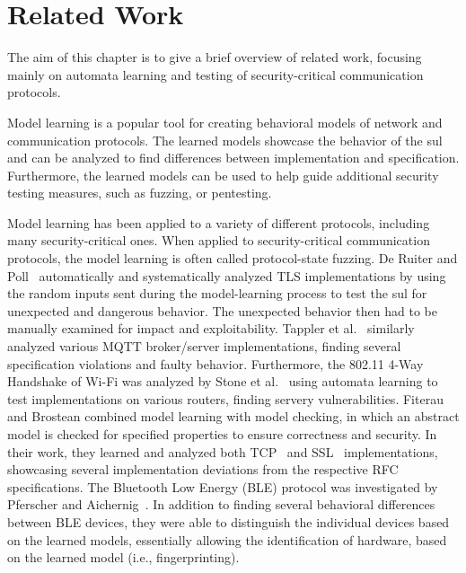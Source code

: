 %
%
% 

\chapter{Related Work}

\label{chap:Related}
The aim of this chapter is to give a brief overview of related work, focusing mainly on automata learning and testing of security-critical communication protocols.

Model learning is a popular tool for creating behavioral models of network and communication protocols. The learned models showcase the behavior of the \ac{sul} and can be analyzed to find differences between implementation and specification. Furthermore, the learned models can be used to help guide additional security testing measures, such as fuzzing, or pentesting. 

Model learning has been applied to a variety of different protocols, including many security-critical ones. When applied to security-critical communication protocols, the model learning is often called protocol-state fuzzing. De Ruiter and Poll~\cite{DBLP:conf/uss/RuiterP15} automatically and systematically analyzed TLS implementations by using the random inputs sent during the model-learning process to test the \ac{sul} for unexpected and dangerous behavior. The unexpected behavior then had to be manually examined for impact and exploitability. Tappler et al.~\cite{DBLP:conf/icst/TapplerAB17} similarly analyzed various MQTT broker/server implementations, finding several specification violations and faulty behavior. Furthermore, the 802.11 4-Way Handshake of Wi-Fi was analyzed by Stone et al.~\cite{DBLP:conf/esorics/StoneCR18} using automata learning to test implementations on various routers, finding servery vulnerabilities.
Fiterau and Brostean combined model learning with model checking, in which an abstract model is checked for specified properties to ensure correctness and security. In their work, they learned and analyzed both TCP~\cite{DBLP:conf/cav/Fiterau-Brostean16} and SSL~\cite{DBLP:conf/spin/Fiterau-Brostean17} implementations, showcasing several implementation deviations from the respective RFC specifications.
The Bluetooth Low Energy (BLE) protocol was investigated by Pferscher and Aichernig~\cite{pferscher2021fingerprinting}. In addition to finding several behavioral differences between BLE devices, they were able to distinguish the individual devices based on the learned models, essentially allowing the identification of hardware, based on the learned model (i.e., fingerprinting).

